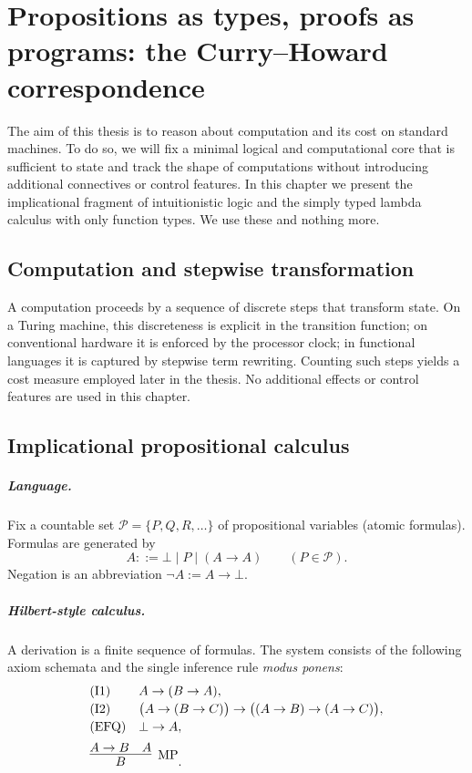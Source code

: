 \chapter{Propositions as types, proofs as programs: the Curry--Howard correspondence}
\label{chap:curry-howard}

The aim of this thesis is to reason about computation and its cost on standard machines. To do so, we will fix a minimal logical and computational core that is sufficient to state and track the shape of computations without introducing additional connectives or control features. In this chapter we present the implicational fragment of intuitionistic logic and the simply typed lambda calculus with only function types. We use these and nothing more.

\section{Computation and stepwise transformation}
A computation proceeds by a sequence of discrete steps that transform state. On a Turing machine, this discreteness is explicit in the transition function; on conventional hardware it is enforced by the processor clock; in functional languages it is captured by stepwise term rewriting. Counting such steps yields a cost measure employed later in the thesis. No additional effects or control features are used in this chapter.



\section{Implicational propositional calculus}
\label{sec:ipc}

\paragraph{Language.}
Fix a countable set $\mathcal{P}=\{P,Q,R,\dots\}$ of propositional variables (atomic formulas). Formulas are generated by
\[
A ::= \bot \mid P \mid (A \to A) \qquad (P \in \mathcal{P}).
\]
Negation is an abbreviation $\neg A := A \to \bot$.

\paragraph{Hilbert-style calculus.}
A derivation is a finite sequence of formulas. The system consists of the following axiom schemata and the single inference rule \emph{modus ponens}:
\[
\begin{array}{ll}
\text{(I1)} & A \to (B \to A), \\[2pt]
\text{(I2)} & \bigl(A \to (B \to C)\bigr) \to \bigl((A \to B) \to (A \to C)\bigr), \\[2pt]
\text{(EFQ)} & \bot \to A, \\[6pt]
\multicolumn{2}{l}{\infer[\mathrm{MP}]{B}{A \to B \quad A}.}
\end{array}
\]

